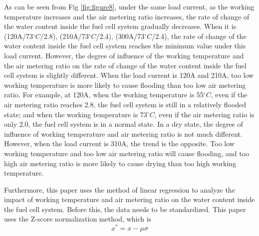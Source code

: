 As can be seen from Fig \ref{fig:figure8}, under the same load current, as the working temperature increases and the air metering ratio increases, the rate of change of the water content inside the fuel cell system gradually decreases. When it is (120A/73$^{\circ}C$/2.8), (210A/73$^{\circ}C$/2.4), (300A/73$^{\circ}C$/2.4), the rate of change of the water content inside the fuel cell system reaches the minimum value under this load current. However, the degree of influence of the working temperature and the air metering ratio on the rate of change of the water content inside the fuel cell system is slightly different. When the load current is 120A and 210A, too low working temperature is more likely to cause flooding than too low air metering ratio. For example, at 120A, when the working temperature is 55$^{\circ}C$, even if the air metering ratio reaches 2.8, the fuel cell system is still in a relatively flooded state; and when the working temperature is 73$^{\circ}C$, even if the air metering ratio is only 2.0, the fuel cell system is in a normal state. In a dry state, the degree of influence of working temperature and air metering ratio is not much different. However, when the load current is 310A, the trend is the opposite. Too low working temperature and too low air metering ratio will cause flooding, and too high air metering ratio is more likely to cause drying than too high working temperature.
\par
Furthermore, this paper uses the method of linear regression to analyze the impact of working temperature and air metering ratio on the water content inside the fuel cell system. Before this, the data needs to be standardized. This paper uses the Z-score normalization method\cite{altman2013predicting,camska2013predicting}, which is
\begin{equation}
x^{*}=x-\mu\sigma	
\end{equation}


